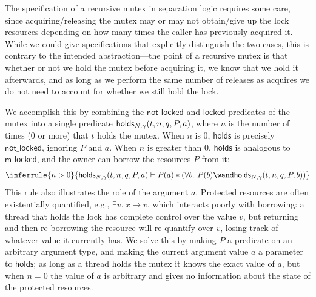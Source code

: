 The specification of a recursive mutex in separation logic requires some care, since acquiring/releasing the mutex may or may not obtain/give up the lock resources depending on how many times the caller has previously acquired it. While we could give specifications that explicitly distinguish the two cases, this is contrary to the intended abstraction---the point of a recursive mutex is that whether or not we hold the mutex before acquiring it, we know that we hold it afterwards, and as long as we perform the same number of releases as acquires we do not need to account for whether we still hold the lock. %

We accomplish this by combining the $\mathsf{not\_locked}$ and $\mathsf{locked}$ predicates of the mutex into a single predicate $\mathsf{holds}_{N, \gamma}(t, n, q, P, a)$, where $n$ is the number of times (0 or more) that $t$ holds the mutex. When $n$ is 0, $\mathsf{holds}$ is precisely $\mathsf{not\_locked}$, ignoring $P$ and $a$. When $n$ is greater than 0, $\mathsf{holds}$ is analogous to $\mathsf{m\_locked}$, and the owner can borrow the resources $P$ from it:
\[\inferrule{n > 0}{\acquirable{N, \gamma}{t}{n}{q}{P}{a} \vdash P(a) \ast (\forall b.\ P(b) \wand \acquirable{N, \gamma}{t}{n}{q}{P}{b})}\]
This rule also illustrates the role of the argument $a$. Protected resources are often existentially quantified, e.g., $\exists v.\ x \mapsto v$, which interacts poorly with borrowing: a thread that holds the lock has complete control over the value $v$, but returning and then re-borrowing the resource will re-quantify over $v$, losing track of whatever value it currently has. We solve this by making $P$ a predicate on an arbitrary argument type, and making the current argument value $a$ a parameter to $\mathsf{holds}$; as long as a thread holds the mutex it knows the exact value of $a$, but when $n = 0$ the value of $a$ is arbitrary and gives no information about the state of the protected resources. %

